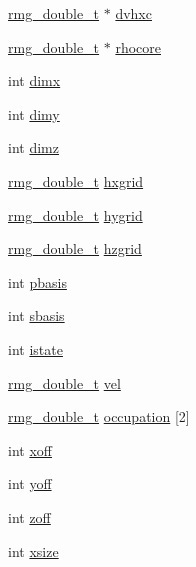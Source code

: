 \begin{DoxyCompactItemize}
\item 
\hyperlink{rmgtypes_8h_aaa16921c14f121c56eaa42390a340db8}{rmg\-\_\-double\-\_\-t} $\ast$ \hyperlink{struct_s_t_a_t_e_aef32578557b34abb497d30fe93fb4ecb}{dvhxc}
\item 
\hyperlink{rmgtypes_8h_aaa16921c14f121c56eaa42390a340db8}{rmg\-\_\-double\-\_\-t} $\ast$ \hyperlink{struct_s_t_a_t_e_a08e1c9cbdf5d94c0efb41faa09446cff}{rhocore}
\item 
int \hyperlink{struct_s_t_a_t_e_aa31886b5a2d1c5e2083d40365fd32227}{dimx}
\item 
int \hyperlink{struct_s_t_a_t_e_a8943da72cd875d3b652258cacaaff5b5}{dimy}
\item 
int \hyperlink{struct_s_t_a_t_e_a712219672f91bd38a3eb3bed2627d841}{dimz}
\item 
\hyperlink{rmgtypes_8h_aaa16921c14f121c56eaa42390a340db8}{rmg\-\_\-double\-\_\-t} \hyperlink{struct_s_t_a_t_e_a2c67ba71c5ec5f4d0a5de4de4f7da374}{hxgrid}
\item 
\hyperlink{rmgtypes_8h_aaa16921c14f121c56eaa42390a340db8}{rmg\-\_\-double\-\_\-t} \hyperlink{struct_s_t_a_t_e_a10e0df4f618e57b39d2a4a8df9de66c7}{hygrid}
\item 
\hyperlink{rmgtypes_8h_aaa16921c14f121c56eaa42390a340db8}{rmg\-\_\-double\-\_\-t} \hyperlink{struct_s_t_a_t_e_a31527cf6a55775f24bbe080ea9683582}{hzgrid}
\item 
int \hyperlink{struct_s_t_a_t_e_a34c6d92691fcdee11f86fafe2a4e84f3}{pbasis}
\item 
int \hyperlink{struct_s_t_a_t_e_ab28c5b3ff044d69158ae0b1c2a437fd4}{sbasis}
\item 
int \hyperlink{struct_s_t_a_t_e_a06c38f8dc6913784596ed3c8908dbfce}{istate}
\item 
\hyperlink{rmgtypes_8h_aaa16921c14f121c56eaa42390a340db8}{rmg\-\_\-double\-\_\-t} \hyperlink{struct_s_t_a_t_e_a1bf04d2c6616ef1ccd4bd9ba53363c3c}{vel}
\item 
\hyperlink{rmgtypes_8h_aaa16921c14f121c56eaa42390a340db8}{rmg\-\_\-double\-\_\-t} \hyperlink{struct_s_t_a_t_e_a7c40eee5f2b5a6dfb4c707899b87daba}{occupation} \mbox{[}2\mbox{]}
\item 
int \hyperlink{struct_s_t_a_t_e_ac433ddbe54995222fd202b642a76116d}{xoff}
\item 
int \hyperlink{struct_s_t_a_t_e_ad78ddb66dc1b8f7cce9c15796efa12f8}{yoff}
\item 
int \hyperlink{struct_s_t_a_t_e_aea36542d4f54ef8f1d79129cb9c7e5b9}{zoff}
\item 
int \hyperlink{struct_s_t_a_t_e_a8aecd574c8f6214c23b3d25475eabb3c}{xsize}

\end{DoxyCompactItemize}
